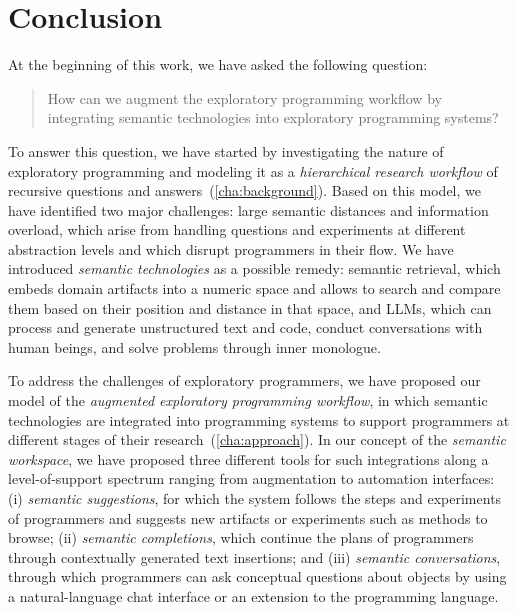 
\chapter{Conclusion}
\label{cha:conclusion}

At the beginning of this work, we have asked the following question:
%
\begin{quote}
	How can we augment the exploratory programming workflow by integrating semantic technologies into exploratory programming systems?
\end{quote}

To answer this question, we have started by investigating the nature of exploratory programming and modeling it as a \emph{hierarchical research workflow} of recursive questions and answers~(\cref{cha:background}).
Based on this model, we have identified two major challenges: large semantic distances and information overload, which arise from handling questions and experiments at different abstraction levels and which disrupt programmers in their flow.
We have introduced \emph{semantic technologies} as a possible remedy: semantic retrieval, which embeds domain artifacts into a numeric space and allows to search and compare them based on their position and distance in that space, and LLMs, which can process and generate unstructured text and code, conduct conversations with human beings, and solve problems through inner monologue.

To address the challenges of exploratory programmers, we have proposed our model of the \emph{augmented exploratory programming workflow}, in which semantic technologies are integrated into programming systems to support programmers at different stages of their research~(\cref{cha:approach}).
In our concept of the \emph{semantic workspace}, we have proposed three different tools for such integrations along a level-of-support spectrum ranging from augmentation to automation interfaces:
(i) \emph{semantic suggestions}, for which the system follows the steps and experiments of programmers and suggests new artifacts or experiments such as methods to browse;
(ii) \emph{semantic completions}, which continue the plans of programmers through contextually generated text insertions;
and (iii) \emph{semantic conversations}, through which programmers can ask conceptual questions about objects by using a natural-language chat interface or an extension to the programming language.


